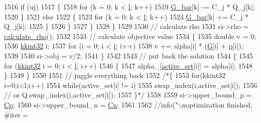 \begin{DoxyCode}
1516         \textcolor{keywordflow}{if}  (uj)
1517         \{
1518           \textcolor{keywordflow}{for}  (k = 0;  k < \hyperlink{class_s_v_m289___m_f_s_1_1_solver_a3b58f02675a93b7f559946c731beebd5}{l};  k++)
1519             \hyperlink{class_s_v_m289___m_f_s_1_1_solver_a384cdc6a8882e17f0b78a817d570c5f7}{G\_bar}[k] -= C\_j * Q\_j[k];
1520         \}
1521         \textcolor{keywordflow}{else}
1522         \{
1523           \textcolor{keywordflow}{for}  (k = 0;  k < \hyperlink{class_s_v_m289___m_f_s_1_1_solver_a3b58f02675a93b7f559946c731beebd5}{l};  k++)
1524             \hyperlink{class_s_v_m289___m_f_s_1_1_solver_a384cdc6a8882e17f0b78a817d570c5f7}{G\_bar}[k] += C\_j * Q\_j[k];
1525         \}
1526       \}
1527     \}
1528   \}
1529 
1530   \textcolor{comment}{// calculate rho}
1531   si->rho = \hyperlink{class_s_v_m289___m_f_s_1_1_solver_a147ed1d007cd7ce50f1e80cfe07c6c6c}{calculate\_rho}();
1532 
1533   \textcolor{comment}{// calculate objective value}
1534   \{
1535     \textcolor{keywordtype}{double} v = 0;
1536     \hyperlink{namespace_k_k_b_a8fa4952cc84fda1de4bec1fbdd8d5b1b}{kkint32} i;
1537     \textcolor{keywordflow}{for}  (i = 0;  i < \hyperlink{class_s_v_m289___m_f_s_1_1_solver_a3b58f02675a93b7f559946c731beebd5}{l};  i++)
1538       v += alpha[i] * (\hyperlink{class_s_v_m289___m_f_s_1_1_solver_a96465496d62f5c9566275270d7a54a4f}{G}[i] + \hyperlink{class_s_v_m289___m_f_s_1_1_solver_aee0ff21847e331b59d7a929b3c813b94}{p}[i]);
1539 
1540     si->obj = v/2;
1541   \}
1542 
1543   \textcolor{comment}{// put back the solution}
1544   \{
1545     \textcolor{keywordflow}{for}  (\hyperlink{namespace_k_k_b_a8fa4952cc84fda1de4bec1fbdd8d5b1b}{kkint32} i = 0;  i < \hyperlink{class_s_v_m289___m_f_s_1_1_solver_a3b58f02675a93b7f559946c731beebd5}{l};  i++)
1546     \{
1547       alpha\_[\hyperlink{class_s_v_m289___m_f_s_1_1_solver_a7b9a480a3eaae0248a03ebf399dd3c75}{active\_set}[i]] = alpha[i];
1548     \}
1549   \}
1550 
1551   \textcolor{comment}{// juggle everything back}
1552   \textcolor{comment}{/*\{}
1553 \textcolor{comment}{    for(kkint32 i=0;i<l;i++)}
1554 \textcolor{comment}{      while(active\_set[i] != i)}
1555 \textcolor{comment}{        swap\_index(i,active\_set[i]);}
1556 \textcolor{comment}{        // or Q.swap\_index(i,active\_set[i]);}
1557 \textcolor{comment}{  \}*/}
1558 
1559   si->upper\_bound\_p = \hyperlink{class_s_v_m289___m_f_s_1_1_solver_a951f59ea72f372f0e188c5815774fc6d}{Cp};
1560   si->upper\_bound\_n = \hyperlink{class_s_v_m289___m_f_s_1_1_solver_a56f6a320000a868937411fa4cfd458b5}{Cn};
1561 
1562   \textcolor{comment}{//info("\(\backslash\)noptimization finished, #iter = %
}
\end{DoxyCode}
